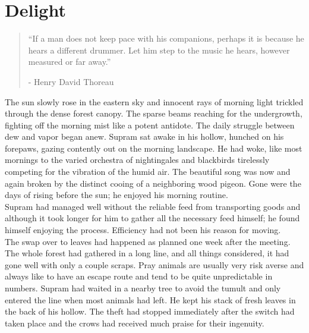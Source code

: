 \documentclass[smalldemyvopaper,11pt,twoside,onecolumn,openright,extrafontsizes]{memoir}
\begin{document}

\chapter{Delight}

\vspace{-1.3cm}
\begin{localsize}{10}
	\begin{quote}
		“If a man does not keep pace with his companions, perhaps it is because he hears a different drummer. Let him step to the music he hears, however measured or far away.”
		\begin{flushright}- Henry David Thoreau \end{flushright}
	\end{quote} 
\end{localsize}
\vspace{1cm}

The sun slowly rose in the eastern sky and innocent rays of morning light trickled through the dense forest canopy. The sparse beams reaching for the undergrowth, fighting off the morning mist like a potent antidote. The daily struggle between dew and vapor began anew. Supram sat awake in his hollow, hunched on his forepaws, gazing contently out on the morning landscape. He had woke, like most mornings to the varied orchestra of nightingales and blackbirds tirelessly competing for the vibration of the humid air. The beautiful song was now and again broken by the distinct cooing of a neighboring wood pigeon. Gone were the days of rising before the sun; he enjoyed his morning routine.\\

Supram had managed well without the reliable feed from transporting goods and although it took longer for him to gather all the necessary feed himself; he found himself enjoying the process. Efficiency had not been his reason for moving.\\

The swap over to leaves had happened as planned one week after the meeting. The whole forest had gathered in a long line, and all things considered, it had gone well with only a couple scraps. Pray animals are usually very risk averse and always like to have an escape route and tend to be quite unpredictable in numbers. Supram had waited in a nearby tree to avoid the tumult and only entered the line when most animals had left. He kept his stack of fresh leaves in the back of his hollow. The theft had stopped immediately after the switch had taken place and the crows had received much praise for their ingenuity.\\
\end{document}

